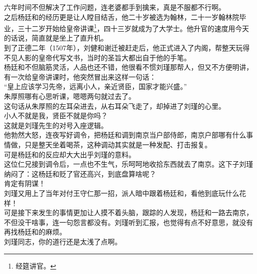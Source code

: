 \begin{multicols}{\theparacolNo}
六年时间不但解决了工作问题，连老婆都手到擒来，真是不服都不行啊。\\

之后杨廷和的经历更是让人瞠目结舌，他二十岁被选为翰林，二十一岁翰林院毕业，三十二岁开始给皇帝讲课\footnote{经筵讲官。}，四十三岁就成为了大学士。他升官的速度用今天的话说，简直就是坐上了直升机。\\

到了正德二年（1507年），刘健和谢迁被赶走后，他正式进入了内阁，帮整天玩得不见人影的皇帝代写文书，当时的圣旨大都出自于他的手笔。\\

杨廷和不但脑筋灵活，人品也还不错，他很看不惯刘瑾那帮人，但又不方便明讲，有一次给皇帝讲课时，他突然冒出来这样一句话：\\

“皇上应该学习先帝，远离小人，亲近贤臣，国家才能兴盛。”\\

朱厚照哪有心思听课，嗯嗯两句就过去了。\\

这句话从朱厚照的左耳朵进去，从右耳朵飞走了，却掉进了刘瑾的心里。\\

小人不就是我，贤臣不就是你吗？\\

这就是刘瑾先生的对号入座逻辑。\\

他勃然大怒，连夜写好调令，把杨廷和调到南京当户部侍郎，南京户部哪有什么事情做，只是整天坐着喝茶，这种调动其实就是一种发配、打击报复。\\

可是杨廷和的反应却大大出乎刘瑾的意料。\\

这位仁兄接到调令后，一点也不生气，乐呵呵地收拾东西就去了南京。这下子刘瑾纳闷了：这杨廷和贬了官还高兴，到底盘算啥呢？\\

肯定有阴谋！\\

刘瑾又用上了当年对付王守仁那一招，派人暗中跟着杨廷和，看他到底玩什么花样！\\

可是接下来发生的事情更加让人摸不着头脑，跟踪的人发现，杨廷和一路去南京，不但没干啥事，连一句怨言都没有。刘瑾听到汇报，也觉得有点不好意思，就没有再找杨廷和的麻烦。\\

刘瑾同志，你的道行还是太浅了点啊。\\


\end{multicols}
